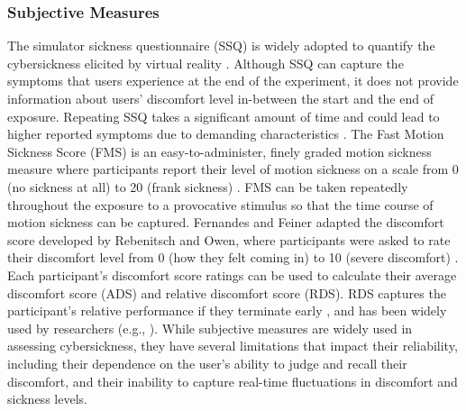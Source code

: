 \subsubsection{Subjective Measures}
The simulator sickness questionnaire (SSQ) is widely adopted to quantify the cybersickness elicited by virtual reality \cite{kennedy_simulator_1993}. 
Although SSQ can capture the symptoms that users experience at the end of the experiment, it does not provide information about users' discomfort level in-between the start and the end of exposure.
Repeating SSQ takes a significant amount of time and could lead to higher reported symptoms due to demanding characteristics \cite{ellis_demand_2007, bimberg_usage_2020}.
The Fast Motion Sickness Score (FMS) is an easy-to-administer, finely graded motion sickness measure where participants report their level of motion sickness on a scale from 0 (no sickness at all) to 20 (frank sickness) \cite{keshavarz_validating_2011}. 
FMS can be taken repeatedly throughout the exposure to a provocative stimulus so that the time course of motion sickness can be captured.
Fernandes and Feiner adapted the discomfort score developed by Rebenitsch and Owen, where participants were asked to rate their discomfort level from 0 (how they felt coming in) to 10 (severe discomfort) \cite{fernandes_combating_2016, rebenitsch_individual_2014}. 
Each participant's discomfort score ratings can be used to calculate their average discomfort score (ADS) and relative discomfort score (RDS).
RDS captures the participant's relative performance if they terminate early \cite{fernandes_combating_2016}, and has been widely used by researchers (e.g., \cite{cao_visually-induced_2018, wu_dont_2021, norouzi_assessing_2018}). While subjective measures are widely used in assessing cybersickness, they have several limitations that impact their reliability, including their dependence on the user's ability to judge and recall their discomfort, and their inability to capture real-time fluctuations in discomfort and sickness levels.


